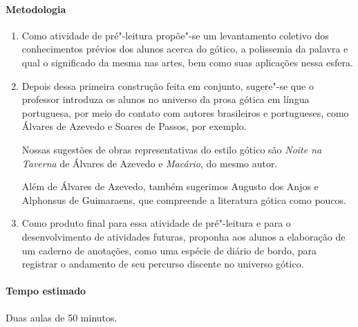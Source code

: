 \documentclass[12pt]{extarticle}
\begin{document}
\paragraph{Metodologia}

\begin{enumerate}


\item
Como atividade de pré"-leitura propõe"-se um levantamento coletivo dos
conhecimentos prévios dos alunos acerca do gótico, a polissemia da palavra e qual o
significado da mesma nas artes, bem como suas aplicações nessa esfera.



\item
Depois dessa primeira construção feita em conjunto, sugere"-se que o professor introduza 
os alunos no universo da prosa gótica em língua portuguesa, por meio do contato com
autores brasileiros e portugueses, como Álvares de Azevedo
e Soares de Passos, por exemplo. 

Nossas sugestões de obras representativas do estilo gótico são \emph{Noite na Taverna} 
de Álvares de Azevedo e \emph{Macário}, do mesmo autor.

Além de Álvares de Azevedo, também sugerimos Augusto dos Anjos e
Alphonsus de Guimaraens, que compreende a literatura gótica como poucos.

\item
Como produto final para essa atividade de pré"-leitura e para o desenvolvimento de atividades 
futuras, proponha aos alunos a elaboração de um caderno de anotações, como uma espécie de diário de bordo, 
para registrar o andamento de seu percurso discente no universo gótico.

\end{enumerate}

\paragraph{Tempo estimado} Duas aulas de 50 minutos. 

\end{document}
